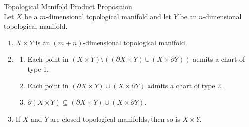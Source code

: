 \begin{proposition}{Topological Manifold Product Proposition}\\
Let $X$ be a $m$-dimensional topological manifold and let $Y$ be an $n$-dimensional topological manifold.
\begin{enumerate}
    \item $X\times Y$ is an $(m+n)$-dimensional topological manifold.
    \item \begin{enumerate}
        \item Each point in $(X\times Y) \setminus ((\partial X \times Y) \cup (X \times \partial Y))$ admits a chart of type 1.
        \item Each point in $(\partial X \times Y) \cup (X \times \partial Y)$ admits a chart of type 2.
        \item $\partial (X\times Y) \subseteq (\partial X \times Y) \cup (X \times \partial Y)$.
    \end{enumerate}

    \item If $X$ and $Y$ are closed topological manifolds, then so is $X \times Y$.
\end{enumerate}
\end{proposition}

